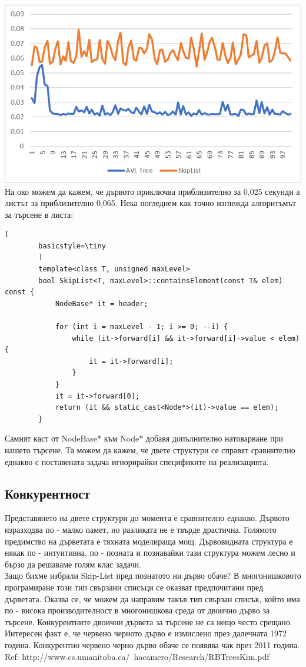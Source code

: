 \documentclass[a4paper,12pt,fleqn]{article}
\begin{document}
	\includegraphics[scale=0.5]{searches.png}\\
	На око можем да кажем, че дървото приключва приблизително за 0,025 секунди а листът за приблизително 0,065. Нека погледнем как точно изглежда алгоритъмът за търсене в листа:\\
	\begin{lstlisting}[
		basicstyle=\tiny
		]
		template<class T, unsigned maxLevel>
		bool SkipList<T, maxLevel>::containsElement(const T& elem) const {
			NodeBase* it = header;
			
			for (int i = maxLevel - 1; i >= 0; --i) {
				while (it->forward[i] && it->forward[i]->value < elem) {
					it = it->forward[i];
				}
			}
			it = it->forward[0];
			return (it && static_cast<Node*>(it)->value == elem);
		}
	\end{lstlisting}
Самият каст от NodeBase* към Node* добавя допълнително натоварване при нашето търсене. Та можем да кажем, че двете структури се справят сравнително еднакво с поставената задача игнорирайки спецификите на реализацията.

\subsection{Конкурентност}
Представянето на двете структури до момента е сравнително еднакво. Дървото изразходва по - малко памет, но разликата не е твърде драстична. Голямото предимство на дърветата е тяхната моделираща мощ. Дървовидната структура е някак по - интуитивна, по - позната и познавайки тази структура можем лесно и бързо да решаваме голям клас задачи.\\
Защо бихме избрали Skip-List пред познатото ни дърво обаче? В многонишковото програмиране този тип свързани списъци се оказват предпочитани пред дърветата.
Оказва се, че можем да направим такъв тип свързан списък, който има по - висока производителност в многонишкова среда от двоично дърво за търсене. Конкурентните двоични дървета за търсене не са нещо често срещано. Интересен факт е, че червено черното дърво е измислено през далечната 1972 година. Конкурентно червено черно дърво обаче се появява чак през 2011 година.\\
Ref: http://www.cs.umanitoba.ca/~hacamero/Research/RBTreesKim.pdf\\
\end{document}
